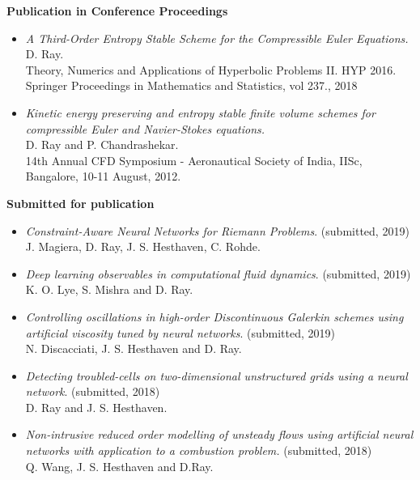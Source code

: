 \documentclass[margin]{res}
\begin{document}
\begin{resume}
\textbf{Publication in Conference Proceedings}                
            \begin{itemize}           
              \item {\it A Third-Order Entropy Stable Scheme for the Compressible Euler Equations.}\\
              D. Ray.\\
              Theory, Numerics and Applications of Hyperbolic Problems II. HYP 2016. Springer Proceedings in Mathematics and Statistics, vol 237., 2018

              \item {\it Kinetic energy preserving and entropy stable finite volume schemes for compressible Euler and Navier-Stokes equations.}\\
              D. Ray and P. Chandrashekar.\\
              14th Annual CFD Symposium - Aeronautical Society of India, IISc, Bangalore, 10-11 August, 2012.
             \end{itemize}

\textbf{Submitted for publication}                
            \begin{itemize}           
              
              \item {\it Constraint-Aware Neural Networks for Riemann Problems}. (submitted, 2019) \\
               J. Magiera, D. Ray, J. S. Hesthaven, C. Rohde.
               
               \item {\it Deep learning observables in computational fluid dynamics}. (submitted, 2019) \\
               K. O. Lye, S. Mishra and D. Ray.
               
               \item {\it Controlling oscillations in high-order Discontinuous Galerkin schemes using artificial viscosity tuned by neural networks}. (submitted, 2019) \\
               N. Discacciati, J. S. Hesthaven and D. Ray.
              
              \item {\it Detecting troubled-cells on two-dimensional unstructured grids using a neural network}. (submitted, 2018) \\
               D. Ray and J. S. Hesthaven.
               
              \item {\it Non-intrusive reduced order modelling of unsteady flows using artificial neural networks with application to a combustion problem.} (submitted, 2018)\\
              Q. Wang, J. S. Hesthaven and D.Ray.
           

\end{itemize}
\end{resume}
\end{document}

